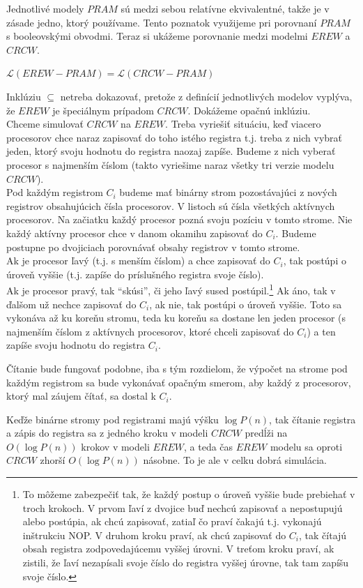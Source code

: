 \medskip
Jednotlivé modely $PRAM$ sú medzi sebou relatívne ekvivalentné,
takže je v zásade jedno, ktorý používame. Tento poznatok využijeme
pri porovnaní $PRAM$ s booleovskými obvodmi. Teraz si ukážeme
porovnanie medzi modelmi $EREW$ a $CRCW$.

\begin{veta}
$\mathcal{L}(EREW-PRAM)=\mathcal{L}(CRCW-PRAM)$
\end{veta}

\begin{dokaz}
Inklúziu $\subseteq$ netreba dokazovať, pretože z definícií
jednotlivých modelov vyplýva, že $EREW$ je špeciálnym prípadom
$CRCW$. Dokážeme opačnú inklúziu.
\\ Chceme simulovať $CRCW$ na $EREW$. Treba vyriešiť
situáciu, keď viacero procesorov chce naraz zapisovať do toho
istého registra t.j. treba z nich vybrať jeden, ktorý svoju
hodnotu do registra naozaj zapíše. Budeme z nich vyberať procesor
s najmenším číslom (takto vyriešime naraz všetky tri verzie modelu
$CRCW$).
\\ Pod každým registrom $C_i$ budeme mať binárny strom
pozostávajúci z nových registrov obsahujúcich čísla procesorov. V
listoch sú čísla všetkých aktívnych procesorov. Na začiatku každý
procesor pozná svoju pozíciu v tomto strome. Nie každý aktívny
procesor chce v danom okamihu zapisovať do $C_i$. Budeme postupne
po dvojiciach porovnávať obsahy registrov v tomto strome.
\\ Ak je procesor ľavý (t.j. s menším číslom) a chce zapisovať do $C_i$,
tak postúpi o úroveň vyššie (t.j. zapíše do príslušného registra
svoje číslo).
\\ Ak je procesor pravý, tak ``skúsi'', či jeho ľavý sused
postúpil.\footnote{To môžeme zabezpečiť tak, že každý postup o
úroveň vyššie bude prebiehať v troch krokoch. V prvom ľaví z
dvojice buď nechcú zapisovať a nepostupujú alebo postúpia, ak chcú
zapisovať, zatiaľ čo praví čakajú t.j. vykonajú inštrukciu NOP. V
druhom kroku praví, ak chcú zapisovať do $C_i$, tak čítajú obsah
registra zodpovedajúcemu vyššej úrovni. V treťom kroku praví, ak
zistili, že ľaví nezapísali svoje číslo do registra vyššej úrovne,
tak tam zapíšu svoje číslo.} Ak áno, tak v ďalšom už nechce
zapisovať do $C_i$, ak nie, tak postúpi o úroveň vyššie. Toto sa
vykonáva až ku koreňu stromu, teda ku koreňu sa dostane len jeden
procesor (s najmenším číslom z aktívnych procesorov, ktoré chceli
zapisovať do $C_i$) a ten zapíše svoju hodnotu do registra $C_i$.

Čítanie bude fungovať podobne, iba s tým rozdielom, že výpočet na
strome pod každým registrom sa bude vykonávať opačným smerom, aby
každý z procesorov, ktorý mal záujem čítať, sa dostal k $C_i$.

Keďže binárne stromy pod registrami majú výšku $\log P(n)$, tak
čítanie registra a zápis do registra sa z jedného kroku v modeli
$CRCW$ predĺži na $O(\log P(n))$ krokov v modeli $EREW$, a teda
čas $EREW$ modelu sa oproti $CRCW$ zhorší $O(\log P(n))$ násobne.
To je ale v celku dobrá simulácia.
\end{dokaz}

